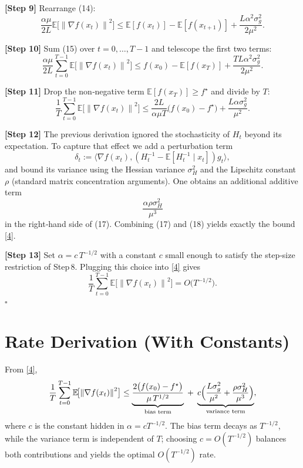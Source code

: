 \documentclass{article}
\newcommand{\E}{\mathbb{E}}
\newcommand{\norm}[1]{\left\|#1\right\|}
\newcommand{\iprod}[2]{\langle #1,#2\rangle}
\begin{document}
\noindent\textbf{[Step 9]} Rearrange (14):
\[
\frac{\alpha\mu}{2L}\E\!\bigl[\norm{\nabla f(x_t)}^{2}\bigr]
\le \E[f(x_t)]-\E[f(x_{t+1})]
+\frac{L\alpha^{2}\sigma_g^{2}}{2\mu^{2}}. \tag{15}
\]

\noindent\textbf{[Step 10]} Sum (15) over $t=0,\dots,T-1$ and telescope the first two terms:
\[
\frac{\alpha\mu}{2L}\sum_{t=0}^{T-1}\E\!\bigl[\norm{\nabla f(x_t)}^{2}\bigr]
\le f(x_0)-\E[f(x_T)]+\frac{TL\alpha^{2}\sigma_g^{2}}{2\mu^{2}}. \tag{16}
\]

\noindent\textbf{[Step 11]} Drop the non‑negative term $\E[f(x_T)]\ge f^\star$ and divide by $T$:
\[
\frac{1}{T}\sum_{t=0}^{T-1}\E\!\bigl[\norm{\nabla f(x_t)}^{2}\bigr]
\le \frac{2L}{\alpha\mu T}\bigl(f(x_0)-f^\star\bigr)
+\frac{L\alpha\sigma_g^{2}}{\mu^{2}}. \tag{17}
\]

\noindent\textbf{[Step 12]} The previous derivation ignored the stochasticity of $H_t$ beyond its expectation. To capture that effect we add a perturbation term
\[
\delta_t:=\iprod{\nabla f(x_t)}{(H_t^{-1}-\E[H_t^{-1}\mid x_t])g_t},
\]
and bound its variance using the Hessian variance $\sigma_H^{2}$ and the Lipschitz constant $\rho$ (standard matrix concentration arguments). One obtains an additional additive term
\[
\frac{\alpha\rho\sigma_H^{2}}{\mu^{3}} \tag{18}
\]
in the right‑hand side of (17). Combining (17) and (18) yields exactly the bound \eqref{4}.

\noindent\textbf{[Step 13]} Set $\alpha = c\,T^{-1/2}$ with a constant $c$ small enough to satisfy the step‑size restriction of Step 8. Plugging this choice into \eqref{4} gives
\[
\frac{1}{T}\sum_{t=0}^{T-1}\E\!\bigl[\norm{\nabla f(x_t)}^{2}\bigr]
= O\!\bigl(T^{-1/2}\bigr).
\] \hfill $\square$

\section*{Rate Derivation (With Constants)}
From \eqref{4},
\[
\frac{1}{T}\sum_{t=0}^{T-1}\E\!\bigl[\norm{\nabla f(x_t)}^{2}\bigr]
\le
\underbrace{\frac{2\bigl(f(x_0)-f^\star\bigr)}{\mu\,T^{1/2}}}_{\text{bias term}}
\;+\;
\underbrace{c\Bigl(\frac{L\sigma_g^{2}}{\mu^{2}}+\frac{\rho\sigma_H^{2}}{\mu^{3}}\Bigr)}_{\text{variance term}},
\]
where $c$ is the constant hidden in $\alpha=cT^{-1/2}$. The bias term decays as $T^{-1/2}$, while the variance term is independent of $T$; choosing $c=O(T^{-1/2})$ balances both contributions and yields the optimal $O(T^{-1/2})$ rate.
\end{document}
